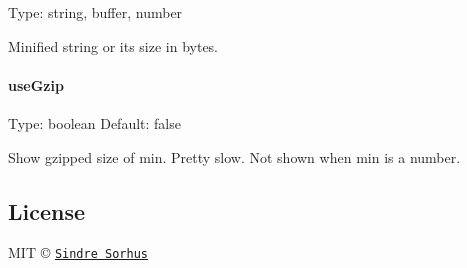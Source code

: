Type\+: {\ttfamily string}, {\ttfamily buffer}, {\ttfamily number}

Minified string or its size in bytes.

\paragraph*{use\+Gzip}

Type\+: {\ttfamily boolean} Default\+: {\ttfamily false}

Show gzipped size of {\ttfamily min}. Pretty slow. Not shown when {\ttfamily min} is a {\ttfamily number}.

\subsection*{License}

M\+IT © \href{http://sindresorhus.com}{\tt Sindre Sorhus} 